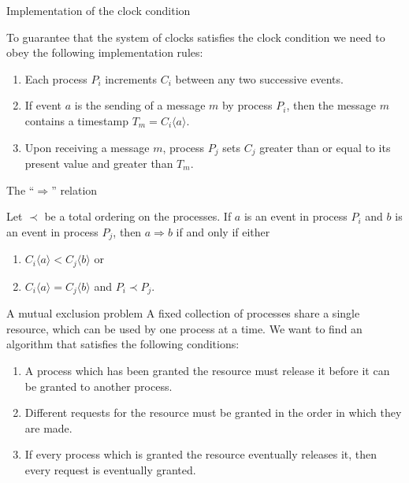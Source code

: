 \documentclass[12pt]{beamer}
\begin{document}
    \begin{frame}{Implementation of the clock condition}
        \begin{lemma}
            To guarantee that the system of clocks satisfies the clock condition we
            need to obey the following implementation rules:
            \begin{enumerate}
                \item Each process \(P_i\) increments \(C_i\) between any two
                successive events.
                \item If event \(a\) is the sending of a message \(m\) by process
                \(P_i\), then the message \(m\) contains a timestamp
                \(T_m = C_i\langle a\rangle\).
                \item Upon receiving a message \(m\), process \(P_j\) sets \(C_j\)
                greater than or equal to its present value and greater than \(T_m\).
            \end{enumerate}
        \end{lemma}
    \end{frame}

    \begin{frame}{The ``\(\Rightarrow\)'' relation}
        \begin{definition}
            Let \(\prec\) be a total ordering on the processes. If \(a\) is an
            event in process \(P_i\) and \(b\) is an event in process \(P_j\), then
            \(a\Rightarrow b\) if and only if either
            \begin{enumerate}
                \item \(C_i\langle a\rangle < C_j\langle b\rangle\) or
                \item \(C_i\langle a\rangle = C_j\langle b\rangle\) and
                \(P_i\prec P_j\).
            \end{enumerate}
        \end{definition}
    \end{frame}

    \begin{frame}{A mutual exclusion problem}
        A fixed collection of processes share a single resource, which can be used
        by one process at a time. We want to find an algorithm that satisfies
        the following conditions:
        \begin{enumerate}
            \item A process which has been granted the resource must release it before
            it can be granted to another process.
            \item Different requests for the resource must be granted in the order in
            which they are made.
            \item If every process which is granted the resource eventually releases
            it, then every request is eventually granted.
        \end{enumerate}
    \end{frame}
\end{document}
